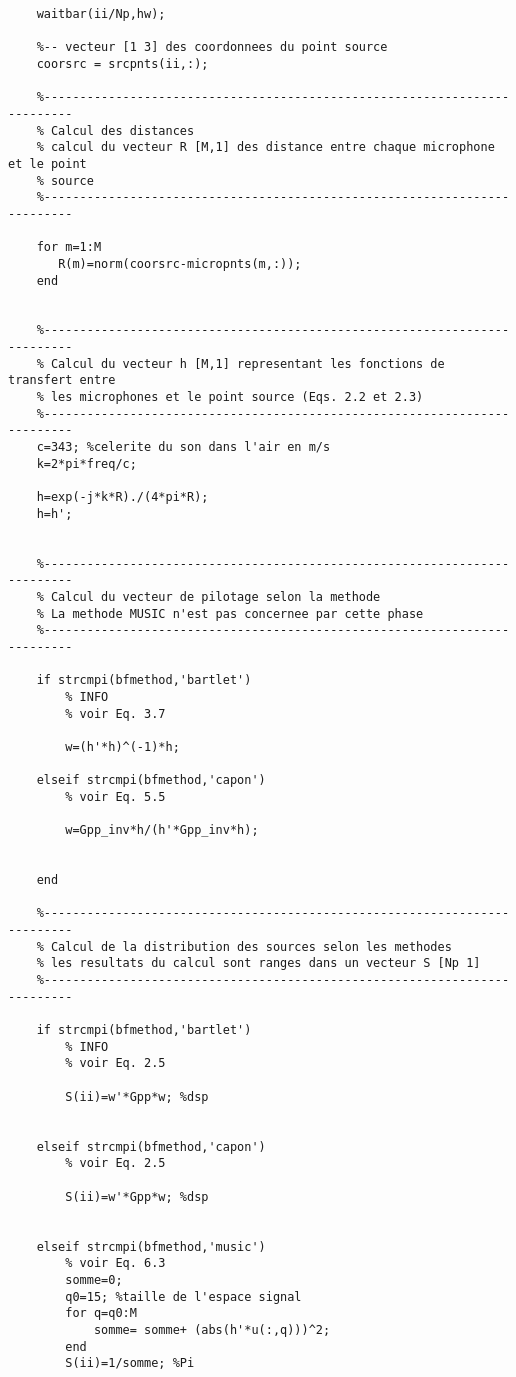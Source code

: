 \begin{verbatim}
    waitbar(ii/Np,hw);
    
    %-- vecteur [1 3] des coordonnees du point source
    coorsrc = srcpnts(ii,:);
    
    %--------------------------------------------------------------------------
    % Calcul des distances 
    % calcul du vecteur R [M,1] des distance entre chaque microphone et le point 
    % source
    %--------------------------------------------------------------------------
    
    for m=1:M
       R(m)=norm(coorsrc-micropnts(m,:));
    end
    
    
    %--------------------------------------------------------------------------
    % Calcul du vecteur h [M,1] representant les fonctions de transfert entre 
    % les microphones et le point source (Eqs. 2.2 et 2.3)
    %--------------------------------------------------------------------------
    c=343; %celerite du son dans l'air en m/s
    k=2*pi*freq/c;
    
    h=exp(-j*k*R)./(4*pi*R);
    h=h';
    
    
    %--------------------------------------------------------------------------
    % Calcul du vecteur de pilotage selon la methode 
    % La methode MUSIC n'est pas concernee par cette phase
    %--------------------------------------------------------------------------

    if strcmpi(bfmethod,'bartlet')
        % INFO
        % voir Eq. 3.7
    
        w=(h'*h)^(-1)*h;

    elseif strcmpi(bfmethod,'capon')
        % voir Eq. 5.5
    
        w=Gpp_inv*h/(h'*Gpp_inv*h);


    end    
    
    %--------------------------------------------------------------------------
    % Calcul de la distribution des sources selon les methodes
    % les resultats du calcul sont ranges dans un vecteur S [Np 1]
    %--------------------------------------------------------------------------
    
    if strcmpi(bfmethod,'bartlet')
        % INFO
        % voir Eq. 2.5
    
        S(ii)=w'*Gpp*w; %dsp
        

    elseif strcmpi(bfmethod,'capon')
        % voir Eq. 2.5
    
        S(ii)=w'*Gpp*w; %dsp
        

    elseif strcmpi(bfmethod,'music')
        % voir Eq. 6.3
        somme=0;
        q0=15; %taille de l'espace signal
        for q=q0:M
            somme= somme+ (abs(h'*u(:,q)))^2;
        end
        S(ii)=1/somme; %Pi
         

\end{verbatim}
